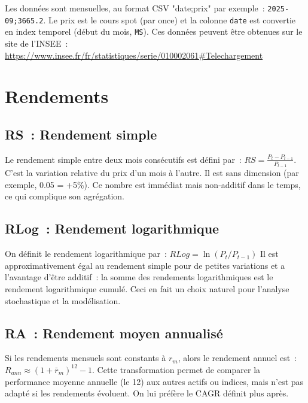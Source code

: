 \documentclass[12pt,a4paper]{article}
\begin{document}
Les données sont mensuelles, au format CSV "date;prix" par exemple~:
\texttt{2025-09;3665.2}. Le prix est le cours spot (par once) et la
colonne \texttt{date} est convertie en index temporel (début du
mois, \texttt{MS}).
Ces données peuvent être obtenues sur le site de l'INSEE~:
{\scriptsize
\href{https://www.insee.fr/fr/statistiques/serie/010002061\#Telechargement}{https://www.insee.fr/fr/statistiques/serie/010002061\#Telechargement}}

\section{Rendements}

\subsection{RS~: Rendement simple}
Le rendement simple entre deux mois consécutifs est défini par~:
$
\boxed{RS = \frac{P_t - P_{t-1}}{P_{t-1}}}.
$
C'est la variation relative du prix d'un mois à l'autre. Il est
sans dimension (par exemple, 0.05 = +5\%). Ce nombre est immédiat
mais non-additif dans le temps, ce qui complique son agrégation.

\subsection{RLog~: Rendement logarithmique}
On définit le rendement logarithmique par~:
$
\boxed{RLog = \ln\left(P_t/P_{t-1}\right)}
$
Il est approximativement égal au rendement simple pour de petites
variations et a l'avantage d'être additif~: la somme des rendements
logarithmiques est le rendement logarithmique cumulé. Ceci en fait
un choix naturel pour l'analyse stochastique et la modélisation.

\subsection{RA~: Rendement moyen annualisé}
Si les rendements mensuels sont constants à
\(r_{m}\), alors le rendement annuel est~:
$
\boxed{R_{ann} \approx (1+\bar r_{m})^{12} - 1}.
$
Cette transformation permet de comparer la performance moyenne annuelle (le 12)
aux autres actifs ou indices, mais n'est pas adapté si les rendements évoluent.
On lui préfère le CAGR définit plus après.
\end{document}
